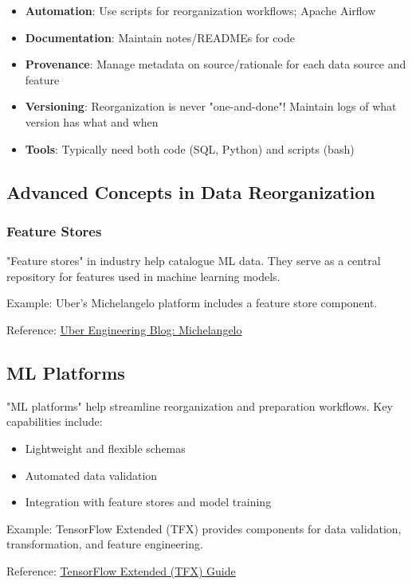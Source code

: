 \documentclass[12pt]{article}
\begin{document}
\begin{tcolorbox}[colback=green!5!white,colframe=green!75!black,title={Best Practices}]
\begin{itemize}
    \item \textbf{Automation}: Use scripts for reorganization workflows; Apache Airflow
    \item \textbf{Documentation}: Maintain notes/READMEs for code
    \item \textbf{Provenance}: Manage metadata on source/rationale for each data source and feature
    \item \textbf{Versioning}: Reorganization is never "one-and-done"! Maintain logs of what version has what and when
    \item \textbf{Tools}: Typically need both code (SQL, Python) and scripts (bash)
\end{itemize}
\end{tcolorbox}

\subsection{Advanced Concepts in Data Reorganization}

\subsubsection{Feature Stores}
\begin{tcolorbox}[colback=yellow!5!white,colframe=yellow!75!black,title={Feature Stores}]
"Feature stores" in industry help catalogue ML data. They serve as a central repository for features used in machine learning models.

Example: Uber's Michelangelo platform includes a feature store component.

Reference: \href{https://eng.uber.com/michelangelo/}{Uber Engineering Blog: Michelangelo}
\end{tcolorbox}

\subsection{ML Platforms}
\begin{tcolorbox}[colback=yellow!5!white,colframe=yellow!75!black,title={ML Platforms}]
"ML platforms" help streamline reorganization and preparation workflows. Key capabilities include:

\begin{itemize}
    \item Lightweight and flexible schemas
    \item Automated data validation
    \item Integration with feature stores and model training
\end{itemize}

Example: TensorFlow Extended (TFX) provides components for data validation, transformation, and feature engineering.

Reference: \href{https://www.tensorflow.org/tfx/guide}{TensorFlow Extended (TFX) Guide}
\end{tcolorbox}
\end{document}
